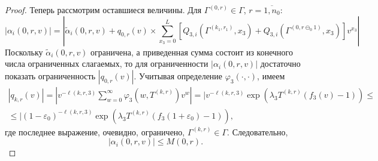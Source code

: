 \documentclass[a4paper,12pt,russian]{extarticle}
\begin{document}
\begin{proof}
Теперь рассмотрим оставшиеся величины. Для $\Gamma^{(0,r)} \in \Gamma$, $r=\overline{1,n_0}$:
\begin{equation*}
|\alpha_i(0,r,v)| = | \tilde{\alpha}_i(0,r,v) + q_{0,r}(v) \times \sum_{x_3=0}^{L} \left[ Q_{3,i}(\Gamma^{(k_1,r_1)},x_3) + Q_{3,i}(\Gamma^{(0,r\ominus_0 1)},x_3) \right] v^{x_3}|
\end{equation*}
Поскольку $\tilde{\alpha}_i(0,r,v)$ ограничена, а приведенная сумма состоит из конечного числа ограниченных слагаемых, то для ограниченности $|\alpha_i(0,r,v)| $ достаточно показать ограниченность $|q_{0,r}(v)|$. Учитывая определение $\varphi_3(\cdot,\cdot)$, имеем
\begin{multline*}
|q_{k,r}(v)| = | v^{-\ell(k,r,3)}\sum_{w=0}^{\infty} \varphi_3(w,T^{(k,r)})v^w| = | v^ {-\ell(k,r,3)} \exp{(\lambda_3 T^{(k,r)} (f_3(v) - 1))}
\leqslant \\ 
\leqslant | (1-\varepsilon_0) ^ {-\ell(k,r,3)} \exp{(\lambda_3 T^{(k,r)} (f_3(1+\varepsilon_0) - 1))},
\end{multline*}
где последнее выражение, очевидно, ограничено, $\Gamma^{(k,r)} \in \Gamma$. Следовательно,
\begin{equation*}
|\alpha_i(0,r,v)| \leqslant M(0,r).
\end{equation*}


\end{proof}
\end{document}
